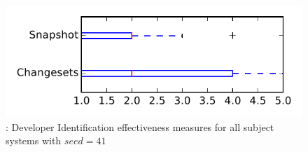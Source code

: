 
\begin{figure}
\centering
\includegraphics[height=0.4\textheight]{figures/dit_seed/rq1_tiny_41}
\caption{\rtwo: Developer Identification effectiveness measures for all subject systems with $seed=41$}
\label{fig:dit_seed:rq1:tiny}
\end{figure}
